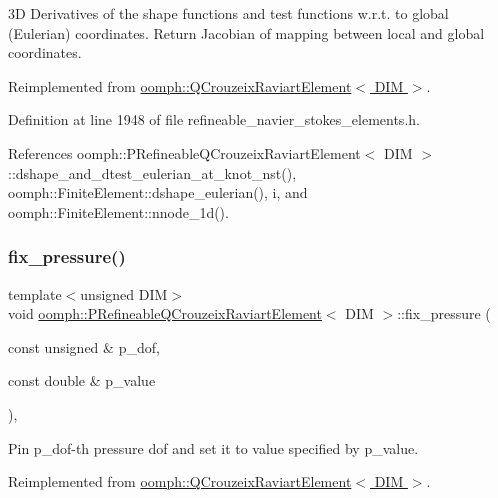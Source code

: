 3D Derivatives of the shape functions and test functions w.\+r.\+t. to global (Eulerian) coordinates. Return Jacobian of mapping between local and global coordinates. 

Reimplemented from \hyperlink{classoomph_1_1QCrouzeixRaviartElement_af1553d79bb5f49fd21f695d468ea59d4}{oomph\+::\+Q\+Crouzeix\+Raviart\+Element$<$ D\+I\+M $>$}.



Definition at line 1948 of file refineable\+\_\+navier\+\_\+stokes\+\_\+elements.\+h.



References oomph\+::\+P\+Refineable\+Q\+Crouzeix\+Raviart\+Element$<$ D\+I\+M $>$\+::dshape\+\_\+and\+\_\+dtest\+\_\+eulerian\+\_\+at\+\_\+knot\+\_\+nst(), oomph\+::\+Finite\+Element\+::dshape\+\_\+eulerian(), i, and oomph\+::\+Finite\+Element\+::nnode\+\_\+1d().

\mbox{\label{classoomph_1_1PRefineableQCrouzeixRaviartElement_a31a014a5e5d549d793968245d56d5d69}} 
\subsubsection{\texorpdfstring{fix\+\_\+pressure()}{fix\_pressure()}}
{\footnotesize\ttfamily template$<$unsigned D\+IM$>$ \\
void \hyperlink{classoomph_1_1PRefineableQCrouzeixRaviartElement}{oomph\+::\+P\+Refineable\+Q\+Crouzeix\+Raviart\+Element}$<$ D\+IM $>$\+::fix\+\_\+pressure (\begin{DoxyParamCaption}\item[{const unsigned \&}]{p\+\_\+dof,  }\item[{const double \&}]{p\+\_\+value }\end{DoxyParamCaption})\hspace{0.3cm}{\ttfamily [inline]}, {\ttfamily [virtual]}}



Pin p\+\_\+dof-\/th pressure dof and set it to value specified by p\+\_\+value. 



Reimplemented from \hyperlink{classoomph_1_1QCrouzeixRaviartElement_ae885b689682846f17db8d2e07f711838}{oomph\+::\+Q\+Crouzeix\+Raviart\+Element$<$ D\+I\+M $>$}.



